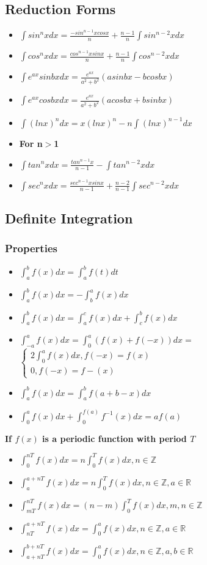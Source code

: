 \documentclass[12pt]{article}
\begin{document}
\subsection{Reduction Forms}
\begin{itemize}
\item $\int sin^{n}xdx= \frac{-sin^{n-1}xcosx}{n}+ \frac{n-1}{n} \int sin^{n-2}xdx$ 
\item $\int cos^{n}xdx= \frac{cos^{n-1}xsinx}{n}+ \frac{n-1}{n} \int cos^{n-2}xdx$
\item $\int e^{ax}sinbxdx = \frac{e^{ax}}{a^2+b^2}(asinbx-bcosbx)$
\item $\int e^{ax}cosbxdx = \frac{e^{ax}}{a^2+b^2}(acosbx+bsinbx)$
\item $\int (lnx)^{n}dx = x(lnx)^{n} -n \int (lnx)^{n-1}dx$
\item \textbf{For n$>$1} 
\item $\int tan^{n}xdx= \frac{tan^{n-1}x}{n-1}- \int tan^{n-2}xdx$ 
\item $\int sec^{n}xdx= \frac{sec^{n-1}xsinx}{n-1}+ \frac{n-2}{n-1} \int sec^{n-2}xdx$ 
\end{itemize}
\subsection{Definite Integration}
\subsubsection{Properties}
\begin{itemize}
\item $\int_{a}^{b}f(x)dx=\int_{a}^{b}f(t)dt$
\item $\int_{a}^{b}f(x)dx=-\int_{b}^{a}f(x)dx$
\item $\int_{a}^{b}f(x)dx=\int_{a}^{c}f(x)dx+\int_{c}^{b}f(x)dx$
\item $\int_{-a}^{a}f(x)dx=\int_{0}^{a}(f(x)+f(-x))dx=$ $\begin{cases}
  2\int_{0}^{a}f(x)dx,f(-x)=f(x)\\
  0,f(-x)=f-(x)
\end{cases}$
\item $\int_{a}^{b}f(x)dx=\int_{a}^{b}f(a+b-x)dx$
\item $\int_{0}^{a}f(x)dx + \int_{0}^{f(a)}f^{-1}(x)dx = af(a)$
\end{itemize}

\textbf{If $f(x)$ is a periodic function with period $T$}
\begin{itemize}
\item $\int_{0}^{nT}f(x)dx=n\int_{0}^{T}f(x)dx,n \in \mathbb{Z}$
\item $\int_{a}^{a+nT}f(x)dx=n\int_{0}^{T}f(x)dx, n \in \mathbb{Z},a \in \mathbb{R}$
\item $\int_{mT}^{nT}f(x)dx=(n-m)\int_{0}^{T}f(x)dx, m,n \in \mathbb{Z}$
\item $\int_{nT}^{a+nT}f(x)dx=\int_{0}^{a}f(x)dx, n \in \mathbb{Z}, a \in \mathbb{R}$
\item $\int_{a+nT}^{b+nT}f(x)dx=\int_{0}^{a}f(x)dx,n \in \mathbb{Z}, a,b \in \mathbb{R}$
\end{itemize}
\end{document}
